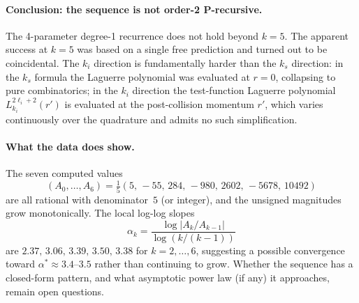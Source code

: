 \documentclass{article}
\begin{document}
\paragraph{Conclusion: the sequence is not order-2 P-recursive.}
The 4-parameter degree-1 recurrence does not hold beyond $k=5$.
The apparent success at $k=5$ was based on a single free prediction and
turned out to be coincidental.
The $k_i$ direction is fundamentally harder than the $k_s$ direction:
in the $k_s$ formula the Laguerre polynomial was evaluated at $r=0$, collapsing
to pure combinatorics; in the $k_i$ direction the test-function Laguerre
polynomial $L_{k_i}^{2\ell_i+2}(r')$ is evaluated at the post-collision
momentum $r'$, which varies continuously over the quadrature and admits no
such simplification.

\paragraph{What the data does show.}
The seven computed values
\[
  (A_0,\ldots,A_6)
  = \tfrac{1}{5}(5,\,-55,\,284,\,-980,\,2602,\,-5678,\,10492)
\]
are all rational with denominator~$5$ (or integer), and the unsigned
magnitudes grow monotonically.
The local log-log slopes
\[
  \alpha_k = \frac{\log|A_k/A_{k-1}|}{\log(k/(k-1))}
\]
are $2.37,\,3.06,\,3.39,\,3.50,\,3.38$ for $k=2,\ldots,6$,
suggesting a possible convergence toward $\alpha^* \approx 3.4$--$3.5$
rather than continuing to grow.
Whether the sequence has a closed-form pattern, and what asymptotic
power law (if any) it approaches, remain open questions.
\end{document}

